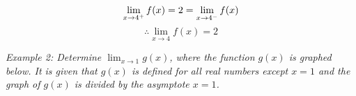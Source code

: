 \documentclass{article}
\begin{document}
            \begin{center}
            \end{center}

            \begin{equation*}
                \lim_{x\to4^+}f(x) = 2 = \lim_{x\to4^-} f(x) \\
            \end{equation*}
            \begin{equation*}
                \therefore \lim_{x\to4} f(x) = 2
            \end{equation*}

            \noindent \color{blue} \textit{Example 2: Determine $\lim_{x\to 1} g(x)$, where the
            function $g(x)$ is graphed below. It is given that $g(x)$ is defined for all real numbers
            except $x=1$ and the graph of $g(x)$ is divided by the asymptote $x=1$.} \color{black} \\
\end{document}
